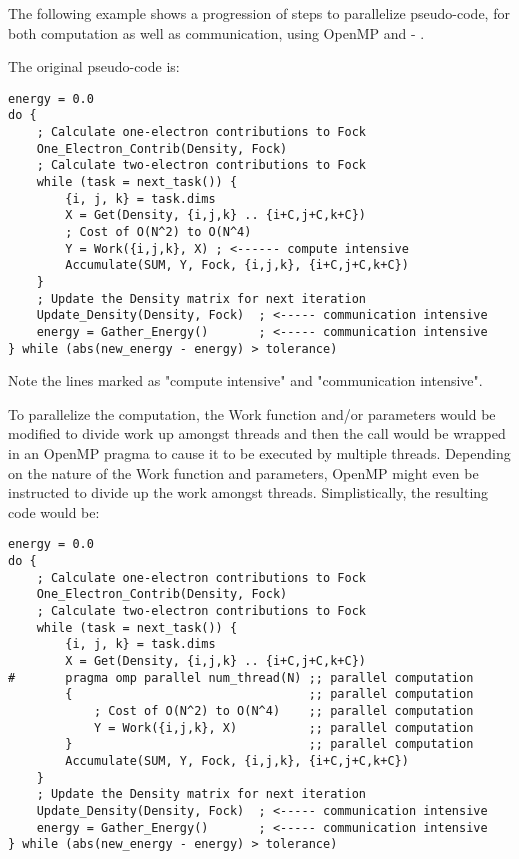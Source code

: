 \begin{example}{\rm
{}%
%

The following example shows a progression of steps to parallelize pseudo-code,
for both computation as well as communication, using OpenMP and
 -
.

The original pseudo-code is:

\begin{verbatim}
energy = 0.0
do {
    ; Calculate one-electron contributions to Fock
    One_Electron_Contrib(Density, Fock)
    ; Calculate two-electron contributions to Fock
    while (task = next_task()) {
        {i, j, k} = task.dims
        X = Get(Density, {i,j,k} .. {i+C,j+C,k+C})
        ; Cost of O(N^2) to O(N^4)
        Y = Work({i,j,k}, X) ; <------ compute intensive
        Accumulate(SUM, Y, Fock, {i,j,k}, {i+C,j+C,k+C})
    }
    ; Update the Density matrix for next iteration
    Update_Density(Density, Fock)  ; <----- communication intensive
    energy = Gather_Energy()       ; <----- communication intensive
} while (abs(new_energy - energy) > tolerance)
\end{verbatim}

Note the lines marked as "compute intensive" and "communication intensive".

To parallelize the computation, the Work function and/or parameters would be
modified to divide work up amongst threads and then the call would be wrapped
in an OpenMP pragma to cause it to be executed by multiple threads.
Depending on the nature of the Work function and parameters, OpenMP might even
be instructed to divide up the work amongst threads.
Simplistically, the resulting code would be:

\begin{verbatim}
energy = 0.0
do {
    ; Calculate one-electron contributions to Fock
    One_Electron_Contrib(Density, Fock)
    ; Calculate two-electron contributions to Fock
    while (task = next_task()) {
        {i, j, k} = task.dims
        X = Get(Density, {i,j,k} .. {i+C,j+C,k+C})
#       pragma omp parallel num_thread(N) ;; parallel computation
        {                                 ;; parallel computation
            ; Cost of O(N^2) to O(N^4)    ;; parallel computation
            Y = Work({i,j,k}, X)          ;; parallel computation
        }                                 ;; parallel computation
        Accumulate(SUM, Y, Fock, {i,j,k}, {i+C,j+C,k+C})
    }
    ; Update the Density matrix for next iteration
    Update_Density(Density, Fock)  ; <----- communication intensive
    energy = Gather_Energy()       ; <----- communication intensive
} while (abs(new_energy - energy) > tolerance)
\end{verbatim}

}
\end{example}
